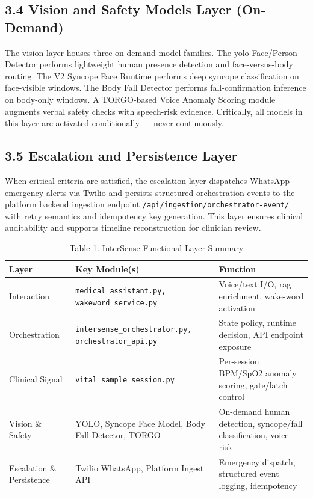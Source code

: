 \documentclass[11pt,a4paper]{article}
\begin{document}
\subsection{3.4 Vision and Safety Models Layer (On-Demand)}
The vision layer houses three on-demand model families. The \gls{yolo} Face/Person Detector performs lightweight human presence detection and face-versus-body routing. The V2 Syncope Face Runtime performs deep syncope classification on face-visible windows. The Body Fall Detector performs fall-confirmation inference on body-only windows. A TORGO-based Voice Anomaly Scoring module augments verbal safety checks with speech-risk evidence. Critically, all models in this layer are activated conditionally — never continuously.

\subsection{3.5 Escalation and Persistence Layer}
When critical criteria are satisfied, the escalation layer dispatches WhatsApp emergency alerts via Twilio and persists structured orchestration events to the platform backend ingestion endpoint \texttt{/api/ingestion/orchestrator-event/} with retry semantics and idempotency key generation. This layer ensures clinical auditability and supports timeline reconstruction for clinician review.

\begin{table}[h!]
  \centering
  \renewcommand{\arraystretch}{1.2}
  \begin{tabular}{|p{3.2cm}|p{5cm}|p{8.2cm}|}
    \hline
    \rowcolor{gray!20}\textbf{Layer} & \textbf{Key Module(s)} & \textbf{Function} \\
    \hline
    Interaction & \texttt{medical\_assistant.py, wakeword\_service.py} & Voice/text I/O, \gls{rag} enrichment, wake-word activation \\
    \hline
    Orchestration & \texttt{intersense\_orchestrator.py, orchestrator\_api.py} & State policy, runtime decision, API endpoint exposure \\
    \hline
    Clinical Signal & \texttt{vital\_sample\_session.py} & Per-session BPM/SpO2 anomaly scoring, gate/latch control \\
    \hline
    Vision \& Safety & YOLO, Syncope Face Model, Body Fall Detector, TORGO & On-demand human detection, syncope/fall classification, voice risk \\
    \hline
    Escalation \& Persistence & Twilio WhatsApp, Platform Ingest API & Emergency dispatch, structured event logging, idempotency \\
    \hline
  \end{tabular}
  \caption{Table 1. InterSense Functional Layer Summary}
\end{table}
\end{document}
